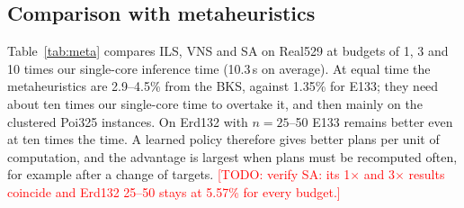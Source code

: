\documentclass[preprint,review,12pt,authoryear]{elsarticle}
\newcommand{\todo}[1]{\textcolor{red}{[TODO: #1]}}
\begin{document}
\subsection{Comparison with metaheuristics}\label{sec:meta}
Table~\ref{tab:meta} compares ILS, VNS and SA on Real529 at budgets of 1, 3 and 10 times our single-core
inference time (10.3\,s on average). At equal time the metaheuristics are 2.9--4.5\% from the BKS, against
1.35\% for E133; they need about ten times our single-core time to overtake it, and then mainly on the clustered
Poi325 instances. On Erd132 with $n=25$--50 E133 remains better even at ten times the time. A learned policy
therefore gives better plans per unit of computation, and the advantage is largest when plans must be
recomputed often, for example after a change of targets.
\todo{verify SA: its 1$\times$ and 3$\times$ results coincide and Erd132 25--50 stays at 5.57\% for every budget.}

\begin{table}[t]\centering\small
\caption{Metaheuristics with the exact evaluator on Real529: mean gap to BKS (\%) by set, at multiples of
E133's single-core time per instance. W/T/L: instances where the method is better/equal/worse than E133.}
\label{tab:meta}
\end{table}
\end{document}
